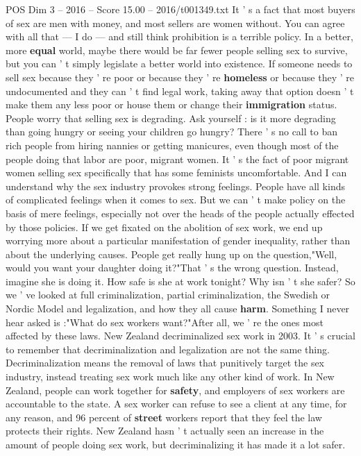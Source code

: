 \begin{textsample}{POS Dim 3 – 2016 – Score 15.00 – 2016/t001349.txt}
It ' s a fact that most buyers of sex are men with money, and most sellers are women without.
You can agree with all that — I do — and still think prohibition is a terrible policy.
In a better, more \textbf{equal} world, maybe there would be far fewer people selling sex to survive, but you can ' t simply legislate a better world into existence.
If someone needs to sell sex because they ' re poor or because they ' re \textbf{homeless} or because they ' re undocumented and they can ' t find legal work, taking away that option doesn ' t make them any less poor or house them or change their \textbf{immigration} status.
People worry that selling sex is degrading.
Ask yourself : is it more degrading than going hungry or seeing your children go hungry?
There ' s no call to ban rich people from hiring nannies or getting manicures, even though most of the people doing that labor are poor, migrant women.
It ' s the fact of poor migrant women selling sex specifically that has some feminists uncomfortable.
And I can understand why the sex industry provokes strong feelings.
People have all kinds of complicated feelings when it comes to sex.
But we can ' t make policy on the basis of mere feelings, especially not over the heads of the people actually effected by those policies.
If we get fixated on the abolition of sex work, we end up worrying more about a particular manifestation of gender inequality, rather than about the underlying causes.
People get really hung up on the question,"Well, would you want your daughter doing it?"That ' s the wrong question.
Instead, imagine she is doing it.
How safe is she at work tonight?
Why isn ' t she safer?
So we ' ve looked at full criminalization, partial criminalization, the Swedish or Nordic Model and legalization, and how they all cause \textbf{harm}.
Something I never hear asked is :"What do sex workers want?"After all, we ' re the ones most affected by these laws.
New Zealand decriminalized sex work in 2003.
It ' s crucial to remember that decriminalization and legalization are not the same thing.
Decriminalization means the removal of laws that punitively target the sex industry, instead treating sex work much like any other kind of work.
In New Zealand, people can work together for \textbf{safety}, and employers of sex workers are accountable to the state.
A sex worker can refuse to see a client at any time, for any reason, and 96 percent of \textbf{street} workers report that they feel the law protects their rights.
New Zealand hasn ' t actually seen an increase in the amount of people doing sex work, but decriminalizing it has made it a lot safer.

\end{textsample}
